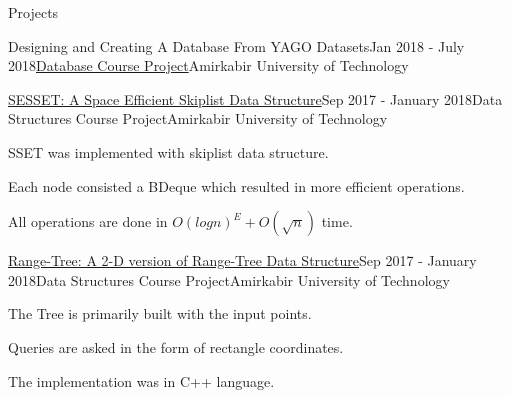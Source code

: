 \documentclass{resume} %
\begin{document}
\begin{rSection}{Projects}
\begin{rSubsection}{Designing and Creating A Database From YAGO Datasets}{Jan 2018 - July 2018}{\href{https://github.com/pouyaaghahoseini/Database-Course}{Database Course Project}}{Amirkabir University of Technology}
		\end{rSubsection}	
		
		
		\begin{rSubsection}{\href{https://github.com/pouyaaghahoseini/DS-Course/tree/master/SE-Skiplist}{SESSET: A Space Efficient Skiplist Data Structure}}{Sep 2017 - January 2018}{Data Structures Course Project}{Amirkabir University of Technology}
			\item SSET‌ was implemented with skiplist data structure.
			\item Each node consisted a BDeque which resulted in more efficient operations.
			\item All operations are done in $O(logn)^{E} + O(\sqrt{n})$ time.
		\end{rSubsection}
		
		
		\begin{rSubsection}{\href{https://github.com/pouyaaghahoseini/DS-Course}{Range-Tree: A 2-D version of Range-Tree Data Structure}}{Sep 2017 - January 2018}{Data Structures Course Project}{Amirkabir University of Technology}
			\item The Tree is primarily built with the input points.
			\item Queries are asked in the form of rectangle coordinates. 
			\item The implementation was in C++ language.
			
		\end{rSubsection}
		
		
		
	\end{rSection}
\end{document}
